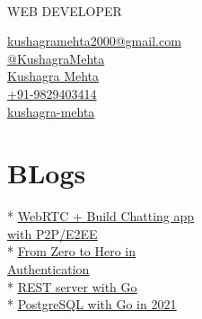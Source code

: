 \documentclass[]{Kushagra-build}
\begin{document}
%
%
\\
\selectfont WEB DEVELOPER \normalfont

\vspace{1em}
    
%
%
\begin{minipage}[t]{0.29\textwidth} 



\faEnvelope \href{mailto:kushagramehta2000@gmail.com}{   kushagramehta2000@gmail.com}\\
\faGithub \href{https://github.com/KushagraMehta}{  @KushagraMehta}\\
\faLinkedinSquare \href{https://www.linkedin.com/in/kushagra-mehta-/}{  Kushagra Mehta} \\
\faPhone \href{tel:+91-9829403414}{ +91-9829403414}\\
\faTwitter \href{https://twitter.com/kushagra_mehta}{   kushagra-mehta} \\
\section{BLogs}

* \href{https://dev.to/kushagra_mehta/webrtc-build-yet-another-chatting-app-but-p2p-e2ee-1l7j}{\underline{WebRTC + Build Chatting app}} \\
\href{https://dev.to/kushagra_mehta/webrtc-build-yet-another-chatting-app-but-p2p-e2ee-1l7j}{\underline{with P2P/E2EE\faLink}} \\

* \href{https://dev.to/kushagra_mehta/series/12260}{\underline{From Zero to Hero in}} \\
\href{https://dev.to/kushagra_mehta/series/12260}{\underline{Authentication\faLink}} \\

* \href{https://dev.to/kushagra_mehta/rest-server-with-go-in-5-minutes-3n8l}{\underline{REST server with Go\faLink}}\\

* \href{https://dev.to/kushagra_mehta/postgresql-with-go-in-2021-3dfg}{\underline{PostgreSQL with Go in 2021\faLink}} \\


\end{minipage}
\end{document}
